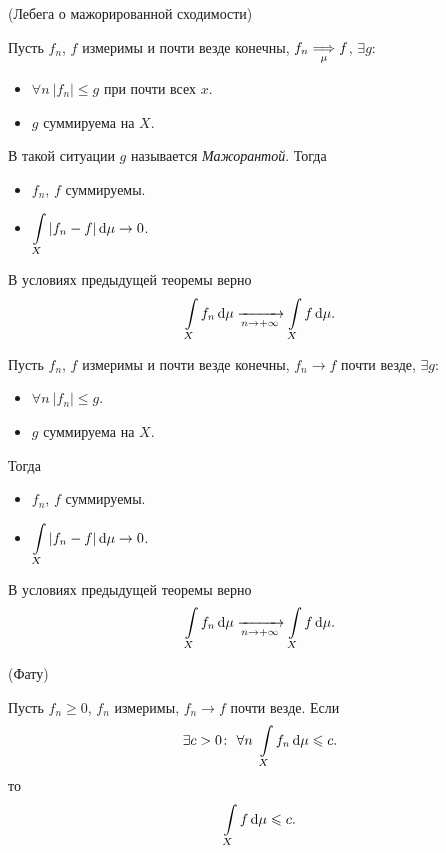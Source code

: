 \begin{theorem}(Лебега о мажорированной сходимости)
    
    Пусть $f_n$, $f$ измеримы и почти везде конечны, $f_n \underset{\mu}{\Longrightarrow} f$, 
    $\exists g\colon~$
    \begin{itemize}
        \item $\forall n~ |f_n| \leqslant g$ при почти всех $x$.
        \item $g$ суммируема на $X$.
    \end{itemize} 
    В такой ситуации $g$ называется \textit{Мажорантой}. Тогда
    \begin{itemize}
        \item $f_n$, $f$ суммируемы.
        \item $\displaystyle \int\limits_{X}{|f_n - f| \,\mathrm{d}\mu} \to 0$.
    \end{itemize} 
\end{theorem}

\begin{corollary}
    
    В условиях предыдущей теоремы верно
\[
    \int\limits_{X}{f_n \,\mathrm{d}\mu} \xrightarrow[n \to +\infty]{} \int\limits_{X}{f \,\mathrm{d}\mu}
.\] 
\end{corollary}

\begin{theorem}
    Пусть $f_n$, $f$ измеримы и почти везде конечны, $f_n \to f$ почти везде,
    $\exists g\colon~$
    \begin{itemize}
        \item $\forall n~ |f_n| \leqslant g$.
        \item $g$ суммируема на $X$.
    \end{itemize}
    Тогда
    \begin{itemize}
        \item $f_n$, $f$ суммируемы.
        \item $\displaystyle \int\limits_{X}{|f_n - f| \,\mathrm{d}\mu} \to 0$.
    \end{itemize} 
\end{theorem}

\begin{corollary}
    
    В условиях предыдущей теоремы верно
\[
    \int\limits_{X}{f_n \,\mathrm{d}\mu} \xrightarrow[n \to +\infty]{} \int\limits_{X}{f \,\mathrm{d}\mu}
.\] 
\end{corollary}

\begin{theorem}(Фату)

    Пусть $f_n \geqslant 0$, $f_n$ измеримы, $f_n \to f$ почти везде. Если
\[
    \exists c > 0\colon~ \forall n~ \int\limits_{X}{f_n \,\mathrm{d}\mu} \leqslant c
.\] 
    то
\[
    \int\limits_{X}{f \,\mathrm{d}\mu} \leqslant c
.\] 
\end{theorem}

